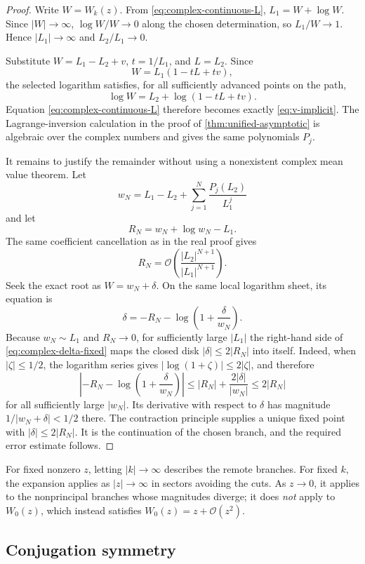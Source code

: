 \documentclass[11pt]{article}
\numberwithin{equation}{section}
\theoremstyle{definition}
\theoremstyle{remark}
\begin{document}
\begin{proof}
Write $W=W_k(z)$.  From \eqref{eq:complex-continuous-L},
$L_1=W+\log W$.  Since $|W|\to\infty$,
$\log W/W\to0$ along the chosen determination, so
$L_1/W\to1$.  Hence $|L_1|\to\infty$ and
$L_2/L_1\to0$.

Substitute $W=L_1-L_2+v$, $t=1/L_1$, and $L=L_2$.  Since
\[
 W=L_1(1-tL+tv),
\]
the selected logarithm satisfies, for all sufficiently advanced points on the
path,
\[
 \log W=L_2+\log(1-tL+tv).
\]
Equation \eqref{eq:complex-continuous-L} therefore becomes exactly
\eqref{eq:v-implicit}.  The Lagrange-inversion calculation in the proof of
\cref{thm:unified-asymptotic} is algebraic over the complex numbers and gives
the same polynomials $P_j$.

It remains to justify the remainder without using a nonexistent complex mean
value theorem.  Let
\[
 w_N=L_1-L_2+\sum_{j=1}^{N}\frac{P_j(L_2)}{L_1^j}
\]
and let
\[
 R_N=w_N+\log w_N-L_1.
\]
The same coefficient cancellation as in the real proof gives
\[
 R_N=\mathcal O\!\left(\frac{|L_2|^{N+1}}{|L_1|^{N+1}}\right).
\]
Seek the exact root as $W=w_N+\delta$.  On the same local logarithm sheet, its
equation is
\begin{equation}
 \delta=-R_N-\log\left(1+\frac{\delta}{w_N}\right).   \label{eq:complex-delta-fixed}
\end{equation}
Because $w_N\sim L_1$ and $R_N\to0$, for sufficiently large $|L_1|$ the
right-hand side of \eqref{eq:complex-delta-fixed} maps the closed disk
$|\delta|\le2|R_N|$ into itself.  Indeed, when $|\zeta|\le1/2$, the logarithm
series gives $|\log(1+\zeta)|\le2|\zeta|$, and therefore
\[
 \left|-R_N-\log\left(1+\frac{\delta}{w_N}\right)\right|
 \le |R_N|+\frac{2|\delta|}{|w_N|}
 \le 2|R_N|
\]
for all sufficiently large $|w_N|$.  Its derivative with respect to $\delta$
has magnitude $1/|w_N+\delta|<1/2$ there.  The contraction principle supplies
a unique fixed point with $|\delta|\le2|R_N|$.  It is the continuation of the
chosen branch, and the required error estimate follows.
\end{proof}

For fixed nonzero $z$, letting $|k|\to\infty$ describes the remote branches.
For fixed $k$, the expansion applies as $|z|\to\infty$ in sectors avoiding the
cuts.  As $z\to0$, it applies to the nonprincipal branches whose magnitudes
diverge; it does \emph{not} apply to $W_0(z)$, which instead satisfies
$W_0(z)=z+\mathcal O(z^2)$.

\subsection{Conjugation symmetry}
\end{document}
